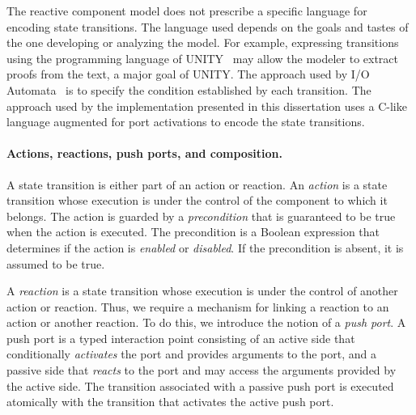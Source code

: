 The reactive component model does not prescribe a specific language for encoding state transitions.
The language used depends on the goals and tastes of the one developing or analyzing the model.
For example, expressing transitions using the programming language of UNITY~\cite{chandy1989parallel} may allow the modeler to extract proofs from the text, a major goal of UNITY.
The approach used by I/O Automata~\cite{nancy1996distributed} is to specify the condition established by each transition.
The approach used by the implementation presented in this dissertation uses a C-like language augmented for port activations to encode the state transitions.

\paragraph{Actions, reactions, push ports, and composition.}
A state transition is either part of an action or reaction.
An \emph{action} is a state transition whose execution is under the control of the component to which it belongs.
The action is guarded by a \emph{precondition} that is guaranteed to be true when the action is executed.
The precondition is a Boolean expression that determines if the action is \emph{enabled} or \emph{disabled}.
If the precondition is absent, it is assumed to be true.

A \emph{reaction} is a state transition whose execution is under the control of another action or reaction.
Thus, we require a mechanism for linking a reaction to an action or another reaction.
To do this, we introduce the notion of a \emph{push port}.
A push port is a typed interaction point consisting of an active side that conditionally \emph{activates} the port and provides arguments to the port, and a passive side that \emph{reacts} to the port and may access the arguments provided by the active side.
The transition associated with a passive push port is executed atomically with the transition that activates the active push port.


